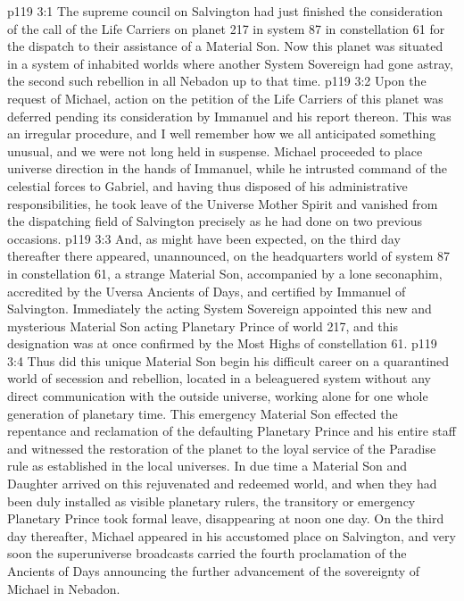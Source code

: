 \vs p119 3:1 The supreme council on Salvington had just finished the consideration of the call of the Life Carriers on planet 217 in system 87 in constellation 61 for the dispatch to their assistance of a Material Son. Now this planet was situated in a system of inhabited worlds where another System Sovereign had gone astray, the second such rebellion in all Nebadon up to that time.
\vs p119 3:2 Upon the request of Michael, action on the petition of the Life Carriers of this planet was deferred pending its consideration by Immanuel and his report thereon. This was an irregular procedure, and I well remember how we all anticipated something unusual, and we were not long held in suspense. Michael proceeded to place universe direction in the hands of Immanuel, while he intrusted command of the celestial forces to Gabriel, and having thus disposed of his administrative responsibilities, he took leave of the Universe Mother Spirit and vanished from the dispatching field of Salvington precisely as he had done on two previous occasions.
\vs p119 3:3 And, as might have been expected, on the third day thereafter there appeared, unannounced, on the headquarters world of system 87 in constellation 61, a strange Material Son, accompanied by a lone seconaphim, accredited by the Uversa Ancients of Days, and certified by Immanuel of Salvington. Immediately the acting System Sovereign appointed this new and mysterious Material Son acting Planetary Prince of world 217, and this designation was at once confirmed by the Most Highs of constellation 61.
\vs p119 3:4 Thus did this unique Material Son begin his difficult career on a quarantined world of secession and rebellion, located in a beleaguered system without any direct communication with the outside universe, working alone for one whole generation of planetary time. This emergency Material Son effected the repentance and reclamation of the defaulting Planetary Prince and his entire staff and witnessed the restoration of the planet to the loyal service of the Paradise rule as established in the local universes. In due time a Material Son and Daughter arrived on this rejuvenated and redeemed world, and when they had been duly installed as visible planetary rulers, the transitory or emergency Planetary Prince took formal leave, disappearing at noon one day. On the third day thereafter, Michael appeared in his accustomed place on Salvington, and very soon the superuniverse broadcasts carried the fourth proclamation of the Ancients of Days announcing the further advancement of the sovereignty of Michael in Nebadon.

